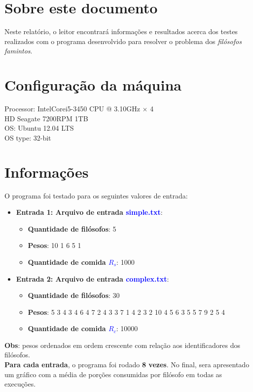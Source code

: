 \documentclass[11pt]{article}
\begin{document}
\section{Sobre este documento}
\indent\indent Neste relatório, o leitor encontrará informações e resultados acerca dos testes realizados com o programa desenvolvido para resolver o problema dos \textit{filósofos famintos}.

\section{Configuração da máquina}
Processor: Intel\textregistered Core\texttrademark i5-3450 CPU @ 3.10GHz $\times$ 4 \\
HD Seagate 7200RPM 1TB \\
OS: Ubuntu 12.04 LTS\\
OS type: 32-bit

\section{Informações}

O programa foi testado para os seguintes valores de entrada:
\begin{itemize}
	\item \textbf{Entrada 1: Arquivo de entrada \textcolor{blue}{simple.txt}}:
	\begin{itemize}
		\item \textbf{Quantidade de filósofos}: 5
		\item \textbf{Pesos}: 10 1 6 5 1
		\item \textbf{Quantidade de comida \textcolor{blue}{$R_s$}}: 1000
	\end{itemize}
	\item \textbf{Entrada 2: Arquivo de entrada \textcolor{blue}{complex.txt}}:
	\begin{itemize}
		\item \textbf{Quantidade de filósofos}: 30
		\item \textbf{Pesos}: 5 3 4 3 4 6 4 7 2 4 3 3 7 1 4 2 3 2 10 4 5 6 3 5 5 7 9 2 5 4
		\item \textbf{Quantidade de comida \textcolor{blue}{$R_c$}}: 10000
	\end{itemize}
\end{itemize}

\noindent \textbf{Obs}: pesos ordenados em ordem crescente com relação aos identificadores dos filósofos. \\
\noindent \textbf{Para cada entrada}, o programa foi rodado \textbf{8 vezes}. No final, sera apresentado um gráfico com a média de porções consumidas por filósofo em todas as execuções.\\
\end{document}
